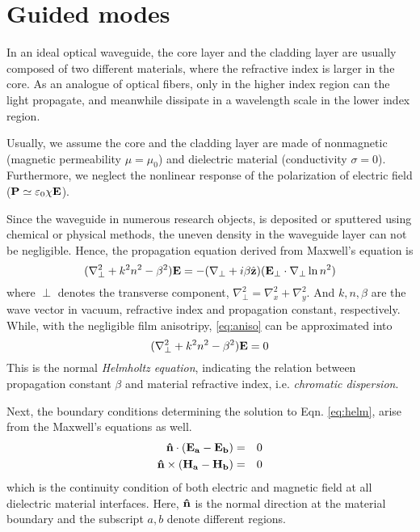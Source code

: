 \documentclass[final]{kuee_en}
\newcommand{\nosymbol}{}
\begin{document}
\section{Guided modes}\label{sec:guide}

In an ideal optical waveguide, the core layer and the cladding layer are usually composed of two different materials, where the refractive index is larger in the core. As an analogue of optical fibers, only in the higher index region can the light propagate, and meanwhile dissipate in a wavelength scale in the lower index region.

Usually, we assume the core and the cladding layer are made of nonmagnetic (magnetic permeability $\mu = \mu_0$) and dielectric material (conductivity $\sigma = 0$). Furthermore, we neglect the nonlinear response of the polarization of electric field ($\vb{P} \simeq \varepsilon_0 \chi \vb{E}$).

Since the waveguide in numerous research objects, is deposited or sputtered using chemical or physical methods, the uneven density in the waveguide layer can not be negligible. Hence, the propagation equation derived from Maxwell's equation is
\begin{equation}\label{eq:aniso}
  (\nabla_{\perp}^2 + k^2 n^2 - \beta^2) \vb{E} = - (\nabla_{\perp} + i
  \beta \hat{\vb{z}}) (\vb{E_{\perp}} \nosymbol \cdot \nabla_{\perp} \ln
  n^2)
\end{equation}
where $\perp$ denotes the transverse component, $\nabla_{\perp}^2 = \nabla_x^2 + \nabla_y^2$. And $k, n, \beta$ are the wave vector in vacuum, refractive index and propagation constant, respectively. While, with the negligible film anisotripy, \autoref{eq:aniso} can be approximated into
\begin{equation}\label{eq:helm}
  (\nabla_{\perp}^2 + k^2 n^2 - \beta^2) \vb{E} = 0
\end{equation}
This is the normal \textit{Helmholtz equation}, indicating the relation between propagation constant $\beta$ and material refractive index, i.e. \textit{chromatic dispersion}.

Next, the boundary conditions determining the solution to Eqn. \ref{eq:helm}, arise from the Maxwell's equations as well.
\begin{eqnarray*}%
  \vb{\hat{n}} \cdot (\vb{E_a - E_b}) & = & 0 \\
  \vb{\hat{n}} \times (\vb{\vb{H_a} - H_{\vb{b}}}) & = & 0
\end{eqnarray*}
which is the continuity condition of both electric and magnetic field at all dielectric material interfaces. Here, $\vb{\hat{n}}$ is the normal direction at the material boundary and the subscript $a, b$ denote different regions.
\end{document}
